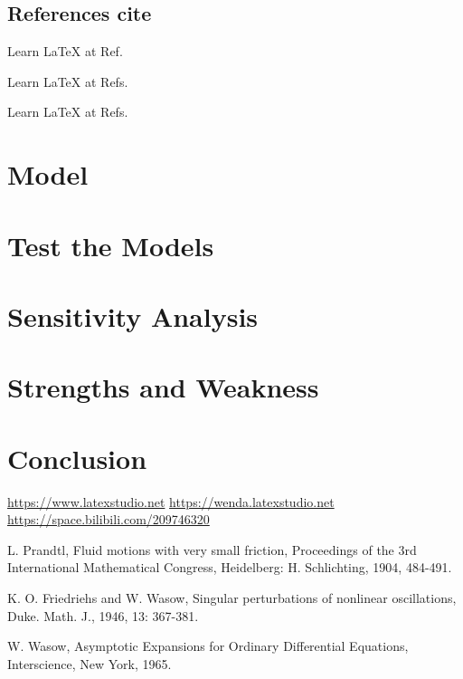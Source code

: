 \documentclass{swmcmthesis}
\begin{document}
\subsection{References cite}
Learn \LaTeX{} at Ref.\cite{bib:one}

Learn \LaTeX{} at Refs.\cite{bib:one,bib:two}

Learn \LaTeX{} at Refs.\cite{bib:one,bib:two,vedio,bib4}

\section{Model}
\lipsum[1-2]

\section{Test the Models}
\lipsum[1-2]

\section{Sensitivity Analysis}
\lipsum[1-2]

\section{Strengths and Weakness}
\lipsum[1-2]

\section{Conclusion}
\lipsum[1-2]


\begin{thebibliography}{9}%
 \url{https://www.latexstudio.net}
 \url{https://wenda.latexstudio.net}
 \url{https://space.bilibili.com/209746320}

 L. Prandtl, Fluid motions with very small friction, Proceedings of the 3rd International Mathematical Congress, Heidelberg: H. Schlichting, 1904, 484-491.

 K. O. Friedriehs and W. Wasow, Singular perturbations of nonlinear oscillations, Duke. Math. J., 1946, 13: 367-381.

 W. Wasow, Asymptotic Expansions for Ordinary Differential Equations, Interscience, New York, 1965.
\end{thebibliography}
\end{document}
